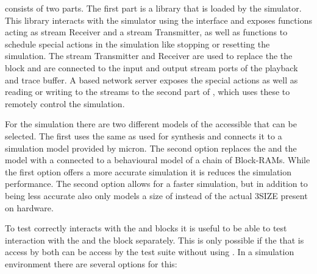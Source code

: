 \flange{} consists of two parts. The first part is a library that is loaded by the simulator. This library interacts with the simulator using the \DPI{} interface and exposes functions acting as stream Receiver and a stream Transmitter, as well as functions to schedule special actions in the simulation like stopping or resetting the simulation. The stream Transmitter and Receiver are used to replace the the \HostARQ{} block and are connected to the input and output stream ports of the playback and trace buffer. A \RCF{} based network server exposes the special actions as well as reading or writing to the streams to the second part of \flange{}, which uses these to remotely control the simulation.

For the simulation there are two different models of the \AXI{} accessible \DRAM{} that can be selected. The first uses the same \MIG{} as used for synthesis and connects it to a \DDR{} simulation model provided by micron\autocite{ref:ddr3Model}. The second option replaces the \MIG{} and the \DDR{} model with a \AXIBRAMController{} connected to a behavioural model of a chain of Block-RAMs. While the first option offers a more accurate simulation it is reduces the simulation performance. The second option allows for a faster simulation, but in addition to being less accurate also only models a size of \SIMMEMSIZE{} instead of the actual \DDR3SIZE{} present on hardware.

To test \ayo{} correctly interacts with the \FAXI{} and \AXIDMA{} blocks it is useful to be able to test interaction with the \FAXI{} and the \AXIDMA{} block separately. This is only possible if the \DRAM{} that is access by both can be access by the test suite without using \FAXI{}. In a simulation environment there are several options for this:

